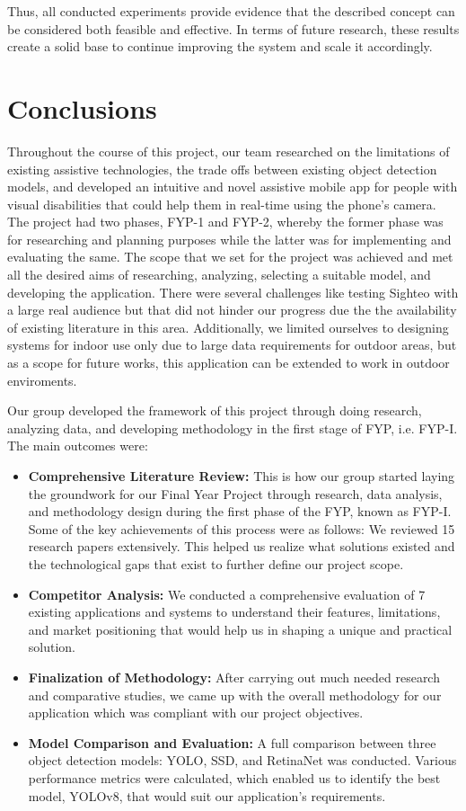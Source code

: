 \documentclass{FastFyp}
\begin{document}
Thus, all conducted experiments provide evidence that the described concept can be considered both feasible and effective. In terms of future research, these results create a solid base to continue improving the system and scale it accordingly.

\chapter{Conclusions}
Throughout the course of this project, our team researched on the limitations of existing assistive technologies, the trade offs between existing object detection models, and developed an intuitive and novel assistive mobile app for people with visual disabilities that could help them in real-time using the phone's camera. The project had two phases, FYP-1 and FYP-2, whereby the former phase was for researching and planning purposes while the latter was for implementing and evaluating the same. The scope that we set for the project was achieved and met all the desired aims of researching, analyzing, selecting a suitable model, and developing the application. There were several challenges like testing Sighteo with a large real audience but that did not hinder our progress due the the availability of existing literature in this area. Additionally, we limited ourselves to designing systems for indoor use only due to large data requirements for outdoor areas, but as a scope for future works, this application can be extended to work in outdoor enviroments.

Our group developed the framework of this project through doing research, analyzing data, and developing methodology in the first stage of FYP, i.e. FYP-I. The main outcomes were:
\begin{itemize}
    \item \textbf{Comprehensive Literature Review:}
    This is how our group started laying the groundwork for our Final Year Project through research, data analysis, and methodology design during the first phase of the FYP, known as FYP-I. Some of the key achievements of this process were as follows: We reviewed 15 research papers extensively. This helped us realize what solutions existed and the technological gaps that exist to further define our project scope.
    \item \textbf{Competitor Analysis:}
    We conducted a comprehensive evaluation of 7 existing applications and systems to understand their features, limitations, and market positioning that would help us in shaping a unique and practical solution.
    \item \textbf{Finalization of Methodology:}
    After carrying out much needed research and comparative studies, we came up with the overall methodology for our application which was compliant with our project objectives.
    \item \textbf{Model Comparison and Evaluation:}
    A full comparison between three object detection models: YOLO, SSD, and RetinaNet was conducted. Various performance metrics were calculated, which enabled us to identify the best model, YOLOv8, that would suit our application's requirements.
\end{itemize}
\end{document}
